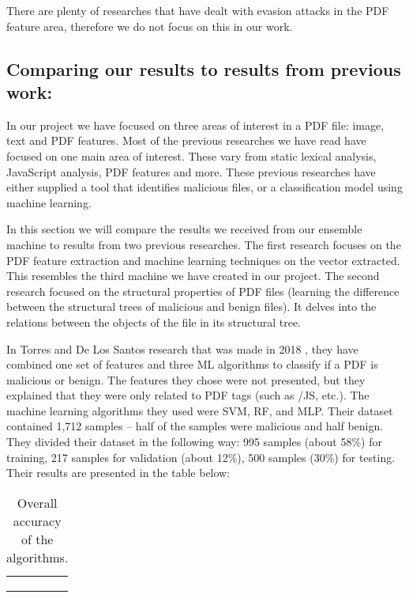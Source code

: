 \documentclass{article}
\begin{document}
\indent There are plenty of researches that have dealt with evasion attacks in the PDF feature area, therefore we do not focus on this in our work.

\subsection{Comparing our results to results from previous work:}
\indent In our project we have focused on three areas of interest in a PDF file: image, text and PDF features. Most of the previous researches we have read have focused on one main area of interest. These vary from static lexical analysis, JavaScript analysis, PDF features and more. These previous researches have either supplied a tool that identifies malicious files, or a classification model using machine learning. 

\indent In this section we will compare the results we received from our ensemble machine to results from two previous researches. The first research focuses on the PDF feature extraction and machine learning techniques on the vector extracted. This resembles the third machine we have created in our project. The second research focused on the structural properties of PDF files (learning the difference between the structural trees of malicious and benign files). It delves into the relations between the objects of the file in its structural tree. 

\indent In Torres and De Los Santos research that was made in 2018 \cite{torres2018malicious}, they have combined one set of features and three ML algorithms to classify if a PDF is malicious or benign. The features they chose were not presented, but they explained that they were only related to PDF tags (such as /JS,  etc.). The machine learning algorithms they used were SVM, RF, and MLP. Their dataset contained 1,712 samples – half of the samples were malicious and half benign. They divided their dataset in the following way: 995 samples (about 58\%) for training, 217 samples for validation (about 12\%), 500 samples (30\%) for testing. Their results are presented in the table below:

\begin{table}[htb]
\centering
\begin{tabular}{|l|l|}
	\hline
	\centering{\textbf{Algorithm}} & \centering{\textbf{Accuracy}}\tabularnewline
	\hline
	\centering{\textbf{SVM}} & \centering{50\%}\tabularnewline
	\hline
	\centering{\textbf{RF}} & \centering{92\%}\tabularnewline
	\hline
	\centering{\textbf{MLP}} & \centering{96\%}\tabularnewline
	\hline
\end{tabular}
\caption{Overall accuracy of the algorithms.}
\end{table}
\end{document}
